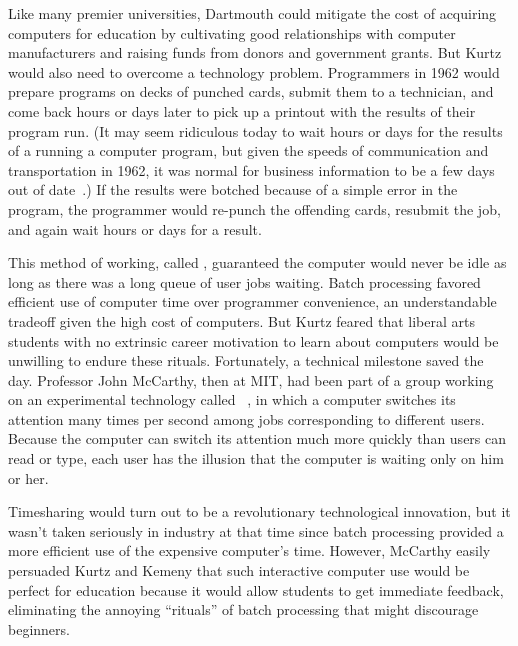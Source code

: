 Like many premier universities, Dartmouth could mitigate the cost of
acquiring computers for education by cultivating good relationships with
computer manufacturers and raising funds from donors and government
grants.
But Kurtz would also need to overcome a technology problem.
Programmers in 1962 would prepare programs on decks of punched cards,
submit them to a technician,
and come back hours or days later to pick up a printout with
the results of their program run.
(It may seem ridiculous today to wait hours or days for the results of a
running a computer program, but given the speeds of 
communication and transportation in 1962, it was normal for
business information to be a few days out of
date~\cite{ceruzzi}.) 
If the results were botched because of a simple error in the program,
the programmer would re-punch the offending cards, resubmit the job, and
again wait hours or days for a result.

This method of working, called , guaranteed the
computer would never be idle as long as there was a long queue of user
jobs waiting.
Batch processing favored efficient use of computer time over
programmer convenience, an understandable
tradeoff given the high cost of computers.
But Kurtz feared that liberal arts students with no
extrinsic career motivation to learn about computers would be unwilling
to endure these rituals.
Fortunately, a technical milestone saved the day.
Professor John McCarthy, then at MIT, had been part of a group working
on an experimental technology called
~\cite{corbato62timesharing}, in which a computer
switches its attention many times per second among jobs corresponding to
different users.
Because the computer can switch its attention much more quickly than
users can read or type, each user has the illusion that the computer
is waiting only on him or her.

Timesharing would turn out to be a revolutionary technological innovation,
but it wasn't taken seriously in industry at that time since batch
processing provided a more efficient use of the expensive computer's
time.  
However, McCarthy easily persuaded Kurtz and Kemeny that such interactive
computer use would be perfect for education because it would allow
students to get
immediate feedback, eliminating the annoying ``rituals'' of batch
processing that might discourage beginners.

